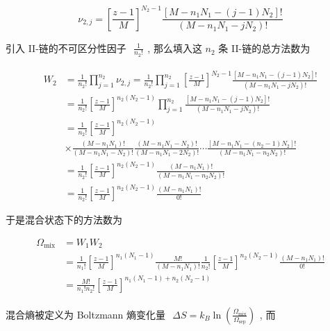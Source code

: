 \documentclass[../../main.tex]{subfiles}
\begin{document}
\begin{enumerate}
{{\begin{itemize}
\begin{enumerate}
$$
\nu_{2,j} = \left[\frac{z-1}{M}\right]^{N_{2}-1}\frac{[M-n_{1}N_{1}-(j-1)N_{2}]!}{(M-n_{1}N_{1}-jN_{2})!}
$$

引入 II-链的不可区分性因子 $\begin{aligned}\frac{1}{n_{2}!}\end{aligned}$, 那么填入这 $n_{2}$ 条 II-链的总方法数为

$$
\begin{aligned}
W_{2} &= \frac{1}{n_{2}!}\prod_{j=1}^{n_{2}}\nu_{2,j} = \frac{1}{n_{2}!}\prod_{j=1}^{n_{2}} \left[\frac{z-1}{M}\right]^{N_{2}-1}\frac{[M-n_{1}N_{1}-(j-1)N_{2}]!}{(M-n_{1}N_{1}-jN_{2})!}\\
&= \frac{1}{n_{2}!} \left[\frac{z-1}{M}\right]^{n_{2}(N_{2}-1)}\prod_{j=1}^{n_{2}}\frac{[M-n_{1}N_{1}-(j-1)N_{2}]!}{(M-n_{1}N_{1}-jN_{2})!}\\
&= \frac{1}{n_{2}!} \left[\frac{z-1}{M}\right]^{n_{2}(N_{2}-1)} \\
&\times \frac{(M-n_{1}N_{1})!}{(M-n_{1}N_{1}-N_{2})!} \frac{(M-n_{1}N_{1}-N_{2})!}{(M-n_{1}N_{1}-2N_{2})!}\cdots \frac{[M-n_{1}N_{1} - (n_{2}-1)N_{2}]!}{(M-n_{1}N_{1}-n_{2}N_{2})!}\\
&= \frac{1}{n_{2}!} \left[\frac{z-1}{M}\right]^{n_{2}(N_{2}-1)} \frac{(M-n_{1}N_{1})!}{(M-n_{1}N_{1}-n_{2}N_{2})!} \\
&= \frac{1}{n_{2}!} \left[\frac{z-1}{M}\right]^{n_{2}(N_{2}-1)} \frac{(M-n_{1}N_{1})!}{0!}
\end{aligned}
$$

\end{enumerate}

\end{itemize}

于是混合状态下的方法数为 

$$
\begin{aligned}
\Omega_{\text{mix}} &= W_{1}W_{2} \\
&= \frac{1}{n_{1}!}\left[\frac{z-1}{M}\right]^{n_{1}(N_{1}-1)}\frac{M!}{(M-n_{1}N_{1})!} \frac{1}{n_{2}!} \left[\frac{z-1}{M}\right]^{n_{2}(N_{2}-1)} \frac{(M-n_{1}N_{1})!}{0!}\\
&= \frac{M!}{n_{1}!n_{2}!}\left[\frac{z-1}{M}\right]^{n_{1}(N_{1}-1) + n_{2}(N_{2}-1)}
\end{aligned}
$$

混合熵被定义为 Boltzmann 熵变化量 $\begin{aligned}\Delta S = k_{B}\ln{\left(\frac{\Omega_{\text{mix}}}{\Omega_{\text{sep}}}\right)}\end{aligned}$, 而

}}
\end{enumerate}
\end{document}
